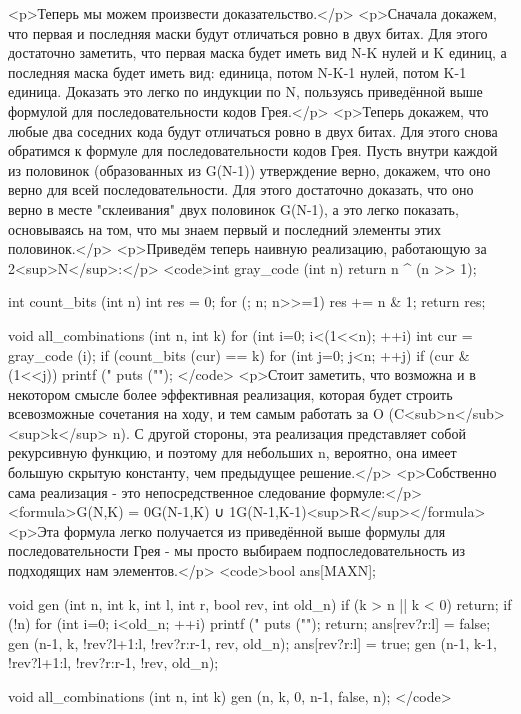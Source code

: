 <p>Теперь мы можем произвести доказательство.</p>
<p>Сначала докажем, что первая и последняя маски будут отличаться ровно в двух битах. Для этого достаточно заметить, что первая маска будет иметь вид N-K нулей и K единиц, а последняя маска будет иметь вид: единица, потом N-K-1 нулей, потом K-1 единица. Доказать это легко по индукции по N, пользуясь приведённой выше формулой для последовательности кодов Грея.</p>
<p>Теперь докажем, что любые два соседних кода будут отличаться ровно в двух битах. Для этого снова обратимся к формуле для последовательности кодов Грея. Пусть внутри каждой из половинок (образованных из G(N-1)) утверждение верно, докажем, что оно верно для всей последовательности. Для этого достаточно доказать, что оно верно в месте "склеивания" двух половинок G(N-1), а это легко показать, основываясь на том, что мы знаем первый и последний элементы этих половинок.</p>
<p>Приведём теперь наивную реализацию, работающую за 2<sup>N</sup>:</p>
<code>int gray_code (int n) {
	return n ^ (n >> 1);
}

int count_bits (int n) {
	int res = 0;
	for (; n; n>>=1)
		res += n & 1;
	return res;
}

void all_combinations (int n, int k) {
	for (int i=0; i<(1<<n); ++i) {
		int cur = gray_code (i);
		if (count_bits (cur) == k) {
			for (int j=0; j<n; ++j)
				if (cur & (1<<j))
					printf ("%
			puts ("");
		}
	}
}</code>
<p>Стоит заметить, что возможна и в некотором смысле более эффективная реализация, которая будет строить всевозможные сочетания на ходу, и тем самым работать за O (C<sub>n</sub><sup>k</sup> n). С другой стороны, эта реализация представляет собой рекурсивную функцию, и поэтому для небольших n, вероятно, она имеет большую скрытую константу, чем предыдущее решение.</p>
<p>Собственно сама реализация - это непосредственное следование формуле:</p>
<formula>G(N,K) = 0G(N-1,K) ∪ 1G(N-1,K-1)<sup>R</sup></formula>
<p>Эта формула легко получается из приведённой выше формулы для последовательности Грея - мы просто выбираем подпоследовательность из подходящих нам элементов.</p>
<code>bool ans[MAXN];

void gen (int n, int k, int l, int r, bool rev, int old_n) {
	if (k > n || k < 0)  return;
	if (!n) {
		for (int i=0; i<old_n; ++i)
			printf ("%
		puts ("");
		return;
	}
	ans[rev?r:l] = false;
	gen (n-1, k, !rev?l+1:l, !rev?r:r-1, rev, old_n);
	ans[rev?r:l] = true;
	gen (n-1, k-1, !rev?l+1:l, !rev?r:r-1, !rev, old_n);
}

void all_combinations (int n, int k) {
	gen (n, k, 0, n-1, false, n);
}</code>